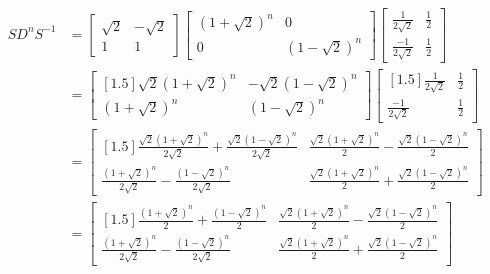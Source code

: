 \documentclass[10pt]{article}
\begin{document}
{{\begin{spacing}{1.5}
\begin{center}
        \begin{align*}
            \;\;\;\;\;\;\;\;\;\;\;\;\;\;\;\;\;\;\;\;\;\;\;\;\;\;{SD}^nS^{-1}&=
            \begin{bmatrix}
                \sqrt2&-\sqrt2\\1&1
            \end{bmatrix}
            \begin{bmatrix}
                (1+\sqrt2)^n&0\\0&(1-\sqrt2)^n
            \end{bmatrix}
            \begin{bmatrix}
                \frac{1}{2\sqrt2}&\frac{1}{2}\\\frac{-1}{2\sqrt2}&\frac{1}{2}
            \end{bmatrix}
            \\
            &=
            \begin{bmatrix}[1.5]
                \sqrt2(1+\sqrt2)^n&-\sqrt2(1-\sqrt2)^n\\(1+\sqrt2)^n&(1-\sqrt2)^n
            \end{bmatrix}
            \begin{bmatrix}[1.5]
                \frac{1}{2\sqrt2}&\frac{1}{2}\\\frac{-1}{2\sqrt2}&\frac{1}{2}
            \end{bmatrix}
            \\
            &=
            \begin{bmatrix}[1.5]
                \frac{\sqrt2(1+\sqrt2)^n}{2\sqrt2}+\frac{\sqrt2(1-\sqrt2)^n}{2\sqrt2}
                &
                \frac{\sqrt2(1+\sqrt2)^n}{2}-\frac{\sqrt2(1-\sqrt2)^n}{2}
                \\
                \frac{(1+\sqrt2)^n}{2\sqrt2}-\frac{(1-\sqrt2)^n}{2\sqrt2}
                &
                \frac{\sqrt2(1+\sqrt2)^n}{2}+\frac{\sqrt2(1-\sqrt2)^n}{2}
            \end{bmatrix}
            \\
            &=
            \begin{bmatrix}[1.5]
                \frac{(1+\sqrt2)^n}{2}+\frac{(1-\sqrt2)^n}{2}
                &
                \frac{\sqrt2(1+\sqrt2)^n}{2}-\frac{\sqrt2(1-\sqrt2)^n}{2}
                \\
                \frac{(1+\sqrt2)^n}{2\sqrt2}-\frac{(1-\sqrt2)^n}{2\sqrt2}
                &
                \frac{\sqrt2(1+\sqrt2)^n}{2}+\frac{\sqrt2(1-\sqrt2)^n}{2}
            \end{bmatrix}

\end{align*}
\end{center}
\end{spacing}}}
\end{document}
